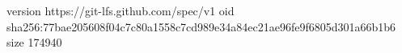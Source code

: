 version https://git-lfs.github.com/spec/v1
oid sha256:77bae205608f04c7c80a1558c7cd989e34a84ec21ae96fe9f6805d301a66b1b6
size 174940
